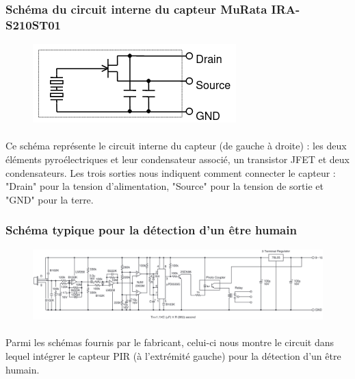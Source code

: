 \documentclass{article}
\begin{document}
            \subsubsection{Schéma du circuit interne du capteur MuRata IRA-S210ST01}
            \begin{figure}[H]
                \centering
                \includegraphics[width=0.4\linewidth]{./images/pyro-schema-circuit-diagram.png}
            \end{figure}

            \paragraph{}
            Ce schéma représente le circuit interne du capteur (de gauche à droite) : les deux éléments pyroélectriques et leur condensateur associé, un transistor JFET et deux condensateurs. Les trois sorties nous indiquent comment connecter le capteur : "Drain" pour la tension d'alimentation, "Source" pour la tension de sortie et "GND" pour la terre.

            \subsubsection{Schéma typique pour la détection d'un être humain}
            \begin{figure}[H]
                \centering
                \includegraphics[width=\linewidth]{./images/pyro-schema-circuit-example.png}
            \end{figure}

            \paragraph{}
            Parmi les schémas fournis par le fabricant, celui-ci nous montre le circuit dans lequel intégrer le capteur PIR (à l'extrémité gauche) pour la détection d'un être humain.
\end{document}
